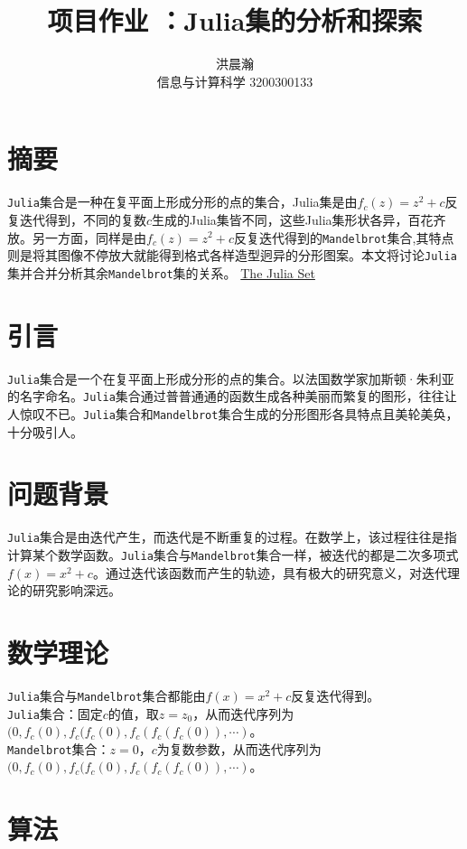 \documentclass{ctexart}
\title{项目作业 ：Julia集的分析和探索}
\author{洪晨瀚 \\ 信息与计算科学 3200300133}
\begin{document}
\maketitle

\graphicspath{{image/}}


\section{摘要}
\verb|Julia|集合是一种在复平面上形成分形的点的集合，Julia集是由$f_c(z)=z^2+c$反复迭代得到，不同的复数$c$生成的Julia集皆不同，这些Julia集形状各异，百花齐放。另一方面，同样是由$f_c(z)=z^2+c$反复迭代得到的\verb|Mandelbrot|集合,其特点则是将其图像不停放大就能得到格式各样造型迥异的分形图案。本文将讨论\verb|Julia|集并合并分析其余\verb|Mandelbrot|集的关系。 \href{https://complex-analysis.com/content/julia_set.html}{The Julia Set}

\section{引言}
\verb|Julia|集合是一个在复平面上形成分形的点的集合。以法国数学家加斯顿·朱利亚的名字命名。\verb|Julia|集合通过普普通通的函数生成各种美丽而繁复的图形，往往让人惊叹不已。\verb|Julia|集合和\verb|Mandelbrot|集合生成的分形图形各具特点且美轮美奂，十分吸引人。\cite{douady1986julia}

\section{问题背景}
\verb|Julia|集合是由迭代产生，而迭代是不断重复的过程。在数学上，该过程往往是指计算某个数学函数。\verb|Julia|集合与\verb|Mandelbrot|集合一样，被迭代的都是二次多项式$f(x)=x^2+c$。通过迭代该函数而产生的轨迹，具有极大的研究意义，对迭代理论的研究影响深远。 

\section{数学理论}
\begin{flushleft}
  \verb|Julia|集合与\verb|Mandelbrot|集合都能由$f(x)=x^2+c$反复迭代得到。\\
  \verb|Julia|集合：固定$c$的值，取$z=z_0$，从而迭代序列为$(0,f_c(0),f_c(f_c(0),f_c(f_c(f_c(0)),\cdots)$。\\
  \verb|Mandelbrot|集合：$z=0$，$c$为复数参数，从而迭代序列为$(0,f_c(0),f_c(f_c(0),f_c(f_c(f_c(0)),\cdots)$。
\end{flushleft}

\section{算法}
\end{document}
